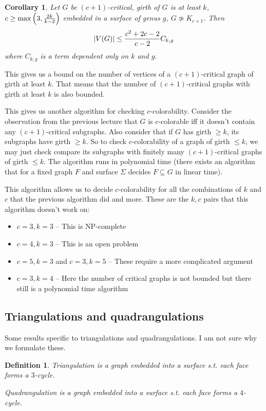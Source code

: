 \documentclass{article}
\newtheorem*{definition}{Definition}
\newtheorem*{corollary}{Corollary}
\begin{document}
\begin{corollary}
	Let $G$ be $(c + 1)$-critical, girth of $G$ is at least $k$, $c \ge
	\max \left ( 3, {{2k}\over{k-2}} \right )$ embedded in a surface of
	genus $g$, $G \not \simeq K_{c+1}$. Then $$ |V(G)| \le {{c^2 + 2c -
	2}\over{c - 2}} C_{k,g} $$ where $C_{k,g}$ is a term dependent only on
	$k$ and $g$.
\end{corollary}

This gives us a bound on the number of vertices of a $(c + 1)$-critical graph
of girth at least $k$. That means that the number of $(c + 1)$-critical graphs
with girth at least $k$ is also bounded.

This gives us another algorithm for checking $c$-colorability. Consider the
observation from the previous lecture that $G$ is $c$-colorable iff it doesn't
contain any $(c + 1)$-critical subgraphs. Also consider that if $G$ has girth
$\ge k$, its subgraphs have girth $\ge k$. So to check $c$-colorability of a
graph of girth $\le k$, we may just check compare its subgraphs with finitely
many $(c + 1)$-critical graphs of girth $\le k$. The algorithm runs in
polynomial time (there exists an algorithm that for a fixed graph $F$ and
surface $\Sigma$ decides $F \subseteq G$ in linear time).

This algorithm allows us to decide $c$-colorability for all the combinations of
$k$ and $c$ that the previous algorithm did and more. These are the $k,c$ pairs
that this algorithm doesn't work on:
\begin{itemize}
	\item $c = 3, k = 3$ -- This is NP-complete
	\item $c = 4, k = 3$ -- This is an open problem
	\item $c = 5, k = 3$ and $c = 3, k = 5$ -- These require a more
		complicated argument
	\item $c = 3, k = 4$ -- Here the number of critical graphs is not
		bounded but there still is a polynomial time algorithm
\end{itemize}

\subsection*{Triangulations and quadrangulations}
Some results specific to triangulations and quadrangulations. I am not sure why
we formulate these.

\begin{definition}
	\emph{Triangulation} is a graph embedded into a surface s.t. each face
	forms a $3$-cycle.

	\emph{Quadrangulation} is a graph embedded into a surface s.t. each
	face forms a $4$-cycle.
\end{definition}
\end{document}
